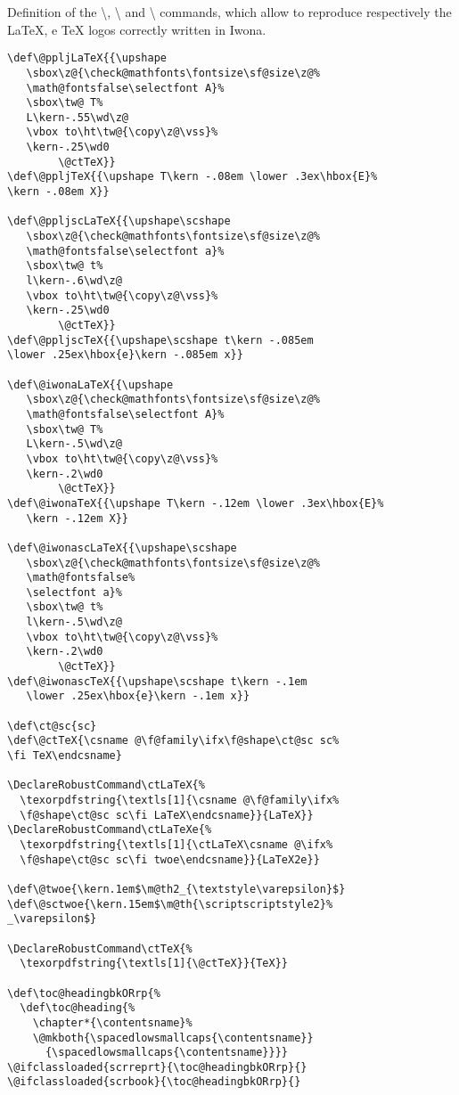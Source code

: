 Definition of the
{\ttfamily\textbackslash\color{RoyalBlue}{ctLaTeX}},
{\ttfamily\textbackslash\color{RoyalBlue}{ctLaTeXe}} and
{\ttfamily\textbackslash\color{RoyalBlue}{ctTeX}} commands, 
which allow to reproduce respectively the \LaTeX, \LaTeXe{} e \TeX{} logos correctly written in Iwona.
\begin{lstlisting}
\def\@ppljLaTeX{{\upshape 
   \sbox\z@{\check@mathfonts\fontsize\sf@size\z@%
   \math@fontsfalse\selectfont A}% 
   \sbox\tw@ T% 
   L\kern-.55\wd\z@ 
   \vbox to\ht\tw@{\copy\z@\vss}% 
   \kern-.25\wd0 
        \@ctTeX}} 
\def\@ppljTeX{{\upshape T\kern -.08em \lower .3ex\hbox{E}%
\kern -.08em X}} 

\def\@ppljscLaTeX{{\upshape\scshape 
   \sbox\z@{\check@mathfonts\fontsize\sf@size\z@%
   \math@fontsfalse\selectfont a}% 
   \sbox\tw@ t% 
   l\kern-.6\wd\z@ 
   \vbox to\ht\tw@{\copy\z@\vss}% 
   \kern-.25\wd0 
        \@ctTeX}} 
\def\@ppljscTeX{{\upshape\scshape t\kern -.085em
\lower .25ex\hbox{e}\kern -.085em x}} 

\def\@iwonaLaTeX{{\upshape 
   \sbox\z@{\check@mathfonts\fontsize\sf@size\z@%
   \math@fontsfalse\selectfont A}% 
   \sbox\tw@ T% 
   L\kern-.5\wd\z@ 
   \vbox to\ht\tw@{\copy\z@\vss}% 
   \kern-.2\wd0 
        \@ctTeX}} 
\def\@iwonaTeX{{\upshape T\kern -.12em \lower .3ex\hbox{E}%
   \kern -.12em X}} 

\def\@iwonascLaTeX{{\upshape\scshape 
   \sbox\z@{\check@mathfonts\fontsize\sf@size\z@%
   \math@fontsfalse%
   \selectfont a}% 
   \sbox\tw@ t% 
   l\kern-.5\wd\z@ 
   \vbox to\ht\tw@{\copy\z@\vss}% 
   \kern-.2\wd0 
        \@ctTeX}} 
\def\@iwonascTeX{{\upshape\scshape t\kern -.1em
   \lower .25ex\hbox{e}\kern -.1em x}} 

\def\ct@sc{sc} 
\def\@ctTeX{\csname @\f@family\ifx\f@shape\ct@sc sc%
\fi TeX\endcsname} 

\DeclareRobustCommand\ctLaTeX{% 
  \texorpdfstring{\textls[1]{\csname @\f@family\ifx%
  \f@shape\ct@sc sc\fi LaTeX\endcsname}}{LaTeX}} 
\DeclareRobustCommand\ctLaTeXe{% 
  \texorpdfstring{\textls[1]{\ctLaTeX\csname @\ifx%
  \f@shape\ct@sc sc\fi twoe\endcsname}}{LaTeX2e}} 

\def\@twoe{\kern.1em$\m@th2_{\textstyle\varepsilon}$} 
\def\@sctwoe{\kern.15em$\m@th{\scriptscriptstyle2}%
_\varepsilon$}

\DeclareRobustCommand\ctTeX{% 
  \texorpdfstring{\textls[1]{\@ctTeX}}{TeX}}

\def\toc@headingbkORrp{% 
  \def\toc@heading{% 
    \chapter*{\contentsname}% 
    \@mkboth{\spacedlowsmallcaps{\contentsname}} 
      {\spacedlowsmallcaps{\contentsname}}}} 
\@ifclassloaded{scrreprt}{\toc@headingbkORrp}{} 
\@ifclassloaded{scrbook}{\toc@headingbkORrp}{}
\end{lstlisting}
